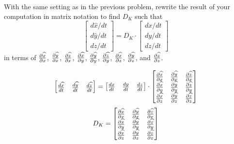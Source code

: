 \documentclass[newpage,hints,handout,12pt,noauthor,nooutcomes]{ximera}
\begin{document}
\begin{problem}
  With the same setting as in the previous problem, rewrite the result
  of your computation in matrix notation to find $D_K$ such that
\[
\begin{bmatrix}
d\hat{x}/dt \\ d\hat{y}/dt \\ d\hat{z}/dt%
\end{bmatrix}
=D_K \cdot \begin{bmatrix}
dx/dt \\ dy/dt \\ dz/dt
\end{bmatrix}
\]
in terms of $\pp[\hat x]{x}$, $\pp[\hat y]{x}$, $\pp[\hat z]{x}$,
$\pp[\hat x]{y}$, $\pp[\hat y]{y}$, $\pp[\hat z]{y}$, $\pp[\hat x]{z}$,
$\pp[\hat y]{z}$, and $\pp[\hat z]{z}$.

\begin{freeResponse}
\[
\begin{bmatrix}
\frac{d\hat{x}}{dt} & \frac{d\hat{y}}{dt} & \frac{d\hat{z}}{dt}%
\end{bmatrix}
=
\begin{bmatrix}
\frac{dx}{dt} & \frac{dy}{dt} & \frac{dz}{dt}%
\end{bmatrix}\cdot
\begin{bmatrix}
\pp[\hat x]{x} & \pp[\hat y]{x} & \pp[\hat z]{x} \\
\pp[\hat x]{y} & \pp[\hat y]{y} & \pp[\hat z]{y} \\
\pp[\hat x]{z} &\pp[\hat y]{z} & \pp[\hat z]{z}
\end{bmatrix}
\]
\[
D_K = 
\begin{bmatrix}
\pp[\hat x]{x} & \pp[\hat y]{x} & \pp[\hat z]{x} \\
\pp[\hat x]{y} & \pp[\hat y]{y} & \pp[\hat z]{y} \\
\pp[\hat x]{z} &\pp[\hat y]{z} & \pp[\hat z]{z}
\end{bmatrix}
\]

\end{freeResponse}
\end{problem}
\end{document}
